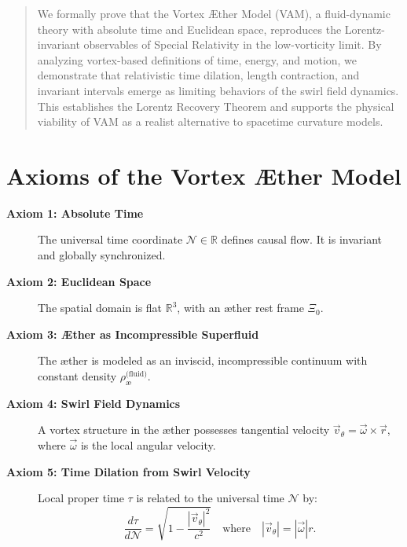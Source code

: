 \documentclass[11pt]{article}
\begin{document}
    \titlepageOpen

    \begin{abstract}
        We formally prove that the Vortex Æther Model (VAM), a fluid-dynamic theory with absolute time and Euclidean space, reproduces the Lorentz-invariant observables of Special Relativity in the low-vorticity limit. By analyzing vortex-based definitions of time, energy, and motion, we demonstrate that relativistic time dilation, length contraction, and invariant intervals emerge as limiting behaviors of the swirl field dynamics. This establishes the Lorentz Recovery Theorem and supports the physical viability of VAM as a realist alternative to spacetime curvature models.


    \end{abstract}

    \titlepageClose
    \fi

    \ifdefined\standalonechapter
    \section{\appendixtitle}
    \else
    \fi

    \section{Axioms of the Vortex Æther Model}

    \begin{description}
        \item[\textbf{Axiom 1: Absolute Time}] The universal time coordinate \( \mathcal{N} \in \mathbb{R} \) defines causal flow. It is invariant and globally synchronized.

        \item[\textbf{Axiom 2: Euclidean Space}] The spatial domain is flat \( \mathbb{R}^3 \), with an æther rest frame \( \Xi_0 \).

        \item[\textbf{Axiom 3: Æther as Incompressible Superfluid}] The æther is modeled as an inviscid, incompressible continuum with constant density \( \rho_{\text{\ae}}^{\text{(fluid)}} \).

        \item[\textbf{Axiom 4: Swirl Field Dynamics}] A vortex structure in the æther possesses tangential velocity \( \vec{v}_\theta = \vec{\omega} \times \vec{r} \), where \( \vec{\omega} \) is the local angular velocity.

        \item[\textbf{Axiom 5: Time Dilation from Swirl Velocity}] Local proper time \( \tau \) is related to the universal time \( \mathcal{N} \) by:
        \[
            \frac{d\tau}{d\mathcal{N}} = \sqrt{1 - \frac{|\vec{v}_\theta|^2}{c^2}} \quad \text{where} \quad |\vec{v}_\theta| = |\vec{\omega}| r.
        \]
    \end{description}
\end{document}
